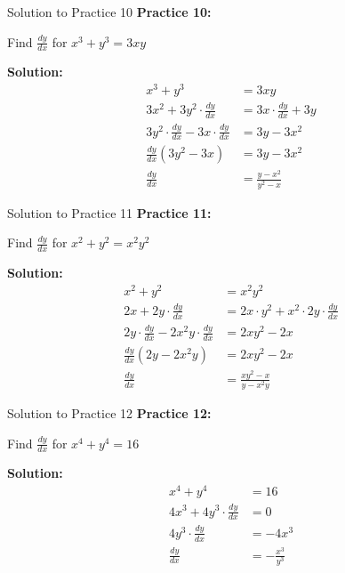 \documentclass[aspectratio=169]{beamer}
\begin{document}
\begin{frame}{Solution to Practice 10}
\textbf{Practice 10:}

Find $\frac{dy}{dx}$ for $x^3 + y^3 = 3xy$

\textbf{Solution:}
\[
\begin{aligned}
  x^3 + y^3 &= 3xy \\
  3x^2 + 3y^2 \cdot \frac{dy}{dx} &= 3x \cdot \frac{dy}{dx} + 3y \\
  3y^2 \cdot \frac{dy}{dx} - 3x \cdot \frac{dy}{dx} &= 3y - 3x^2 \\
  \frac{dy}{dx}(3y^2 - 3x) &= 3y - 3x^2 \\
  \frac{dy}{dx} &= \frac{y - x^2}{y^2 - x}
\end{aligned}
\]
\end{frame}

\begin{frame}{Solution to Practice 11}
\textbf{Practice 11:}

Find $\frac{dy}{dx}$ for $x^2 + y^2 = x^2y^2$

\textbf{Solution:}
\[
\begin{aligned}
  x^2 + y^2 &= x^2y^2 \\
  2x + 2y \cdot \frac{dy}{dx} &= 2x \cdot y^2 + x^2 \cdot 2y \cdot \frac{dy}{dx} \\
  2y \cdot \frac{dy}{dx} - 2x^2y \cdot \frac{dy}{dx} &= 2xy^2 - 2x \\
  \frac{dy}{dx}(2y - 2x^2y) &= 2xy^2 - 2x \\
  \frac{dy}{dx} &= \frac{xy^2 - x}{y - x^2y}
\end{aligned}
\]
\end{frame}

\begin{frame}{Solution to Practice 12}
\textbf{Practice 12:}

Find $\frac{dy}{dx}$ for $x^4 + y^4 = 16$

\textbf{Solution:}
\[
\begin{aligned}
  x^4 + y^4 &= 16 \\
  4x^3 + 4y^3 \cdot \frac{dy}{dx} &= 0 \\
  4y^3 \cdot \frac{dy}{dx} &= -4x^3 \\
  \frac{dy}{dx} &= -\frac{x^3}{y^3}
\end{aligned}
\]
\end{frame}
\end{document}
